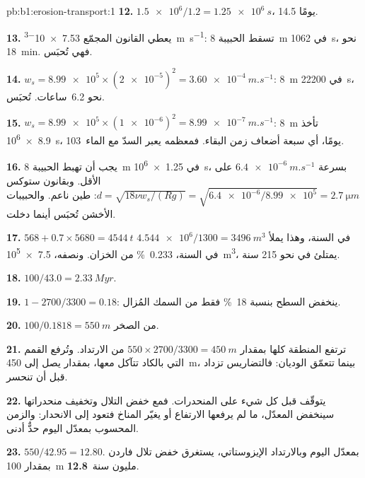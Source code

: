 \begin{solution}{pb:b1:erosion-transport:1}
\textbf{12.} $\num{1.5e6}/1.2 = \qty{1.25e6}{s}$، \num{14.5} يومًا.

\textbf{13.} يعطي القانون المجمّع \qty{7.53e-3}{m.s^{-1}}: تسقط الحبيبة \qty{8}{m} في \qty{1062}{s}، نحو \qty{18}{min}. فهي تُحبَس.

\textbf{14.} $w_s = \num{8.99e5} \times (\num{2e-5})^2 =
\qty{3.60e-4}{m.s^{-1}}$: \qty{8}{m} في \qty{22200}{s}، نحو \num{6.2}~ساعات. تُحبَس.

\textbf{15.} $w_s = \num{8.99e5} \times (\num{1e-6})^2 =
\qty{8.99e-7}{m.s^{-1}}$: \qty{8}{m} تأخذ \qty{8.9e6}{s}، \num{103}~يومًا، أي سبعة أضعاف زمن البقاء. فمعظمه يعبر السدّ مع الماء.

\textbf{16.} يجب أن تهبط الحبيبة \qty{8}{m} في \qty{1.25e6}{s}، بسرعة $\qty{6.4e-6}{m.s^{-1}}$ على الأقل. وبقانون ستوكس $d = \sqrt{18\nu
w_s/(Rg)} = \sqrt{\num{6.4e-6}/\num{8.99e5}} = \qty{2.7}{\micro m}$: طين ناعم. والحبيبات الأخشن تُحبَس أينما دخلت.

\textbf{17.} $568 + 0.7 \times 5680 = \qty{4544}{t}$ في السنة، وهذا يملأ
$\num{4.544e6}/1300 = \qty{3496}{m^3}$ في السنة، \qty{0.233}{\percent} من
الخزان. ونصفه، \qty{7.5e5}{m^3}، يمتلئ في نحو \num{215} سنة.

\textbf{18.} $100/43.0 = \qty{2.33}{Myr}$.

\textbf{19.} $1 - 2700/3300 = 0.18$: ينخفض السطح بنسبة \qty{18}{\percent} فقط من السمك المُزال.

\textbf{20.} $100/0.1818 = \qty{550}{m}$ من الصخر.

\textbf{21.} ترتفع المنطقة كلها بمقدار $550 \times 2700/3300 = \qty{450}{m}$
من الارتداد. وتُرفع القمم التي بالكاد تتآكل معها، بمقدار يصل إلى \qty{450}{m}، بينما تتعمّق الوديان: فالتضاريس تزداد قبل أن تنحسر.

\textbf{22.} يتوقّف  قبل كل شيء على المنحدرات. فمع خفض التلال وتخفيف منحدراتها سينخفض المعدّل، ما لم يرفعها الارتفاع أو يغيّر المناخ فتعود إلى الانحدار: والزمن المحسوب بمعدّل اليوم حدٌّ أدنى.

\textbf{23.} $550/42.95 = 12.80$. بمعدّل اليوم وبالارتداد الإيزوستاتي، يستغرق خفض تلال فاردن بمقدار \qty{100}{m} \textbf{12.8}~مليون سنة.
\end{solution}
